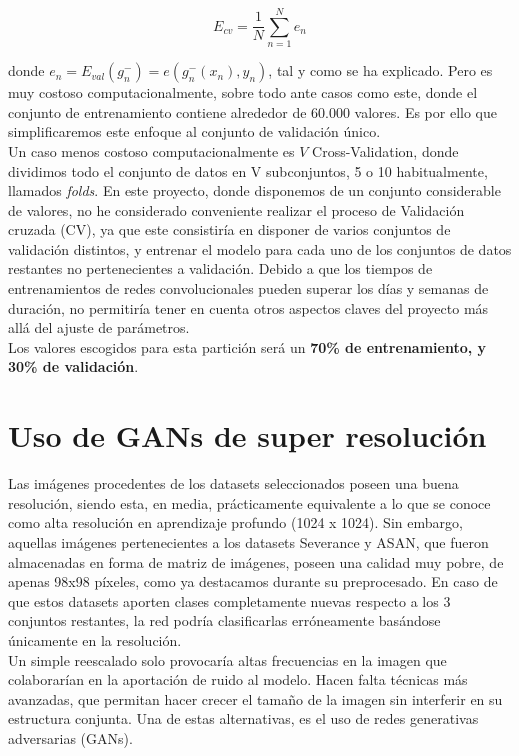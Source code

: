 $$E_{cv} = \frac{1}{N}\sum^{N}_{n=1} e_n$$

donde $e_n = E_{val}(g^-_n) = e(g_n^-(x_n),y_n)$, tal y como se ha explicado. Pero es muy costoso computacionalmente, sobre todo ante casos como este, donde el conjunto de entrenamiento contiene alrededor de 60.000 valores. Es por ello que simplificaremos este enfoque al conjunto de validación único.\\

Un caso menos costoso computacionalmente es $V$ Cross-Validation, donde dividimos todo el conjunto de datos en V subconjuntos, 5 o 10 habitualmente, llamados \textit{folds}. En este proyecto, donde disponemos de un conjunto considerable de valores, no he considerado conveniente realizar el proceso de Validación cruzada (CV), ya que este consistiría en disponer de varios conjuntos de validación distintos, y entrenar el modelo para cada uno de los conjuntos de datos restantes no pertenecientes a validación. Debido a que los tiempos de entrenamientos de redes convolucionales pueden superar los días y semanas de duración, no permitiría tener en cuenta otros aspectos claves del proyecto más allá del ajuste de parámetros.\\

Los valores escogidos para esta partición será un \textbf{70\% de entrenamiento, y 30\% de validación}.

\section{Uso de GANs de super resolución}

Las imágenes procedentes de los datasets seleccionados poseen una buena resolución, siendo esta, en media, prácticamente equivalente a lo que se conoce como alta resolución en aprendizaje profundo (1024 x 1024). Sin embargo, aquellas imágenes pertenecientes a los datasets Severance y ASAN, que fueron almacenadas en forma de matriz de imágenes, poseen una calidad muy pobre, de apenas 98x98 píxeles, como ya destacamos durante su preprocesado. En caso de que estos datasets aporten clases completamente nuevas respecto a los 3 conjuntos restantes, la red podría clasificarlas erróneamente basándose únicamente en la resolución.\\

Un simple reescalado solo provocaría altas frecuencias en la imagen que colaborarían en la aportación de ruido al modelo. Hacen falta técnicas más avanzadas, que permitan hacer crecer el tamaño de la imagen sin interferir en su estructura conjunta. Una de estas alternativas, es el uso de redes generativas adversarias (GANs).

